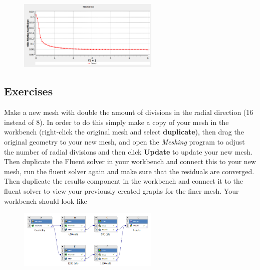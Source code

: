 \documentclass[11pt,a4paper,oneside]{scrartcl}
\newcommand\bfr[1]{\textcolor[rgb]{1,0.00,0.00}{\textbf{\textsf{#1}}}}
\begin{document}
\begin{figure}[H]
\begin{center}
\includegraphics[width=0.6\textwidth,clip]{skin_friction_coefficient.png}
\end{center}
\end{figure}


\subsection{Exercises}
Make a new mesh with double the amount of divisions in the radial direction (16 instead of 8). In order to do this simply make a copy of your mesh in the workbench (right-click the original mesh and select \bfr{duplicate}), then drag the original geometry to your new mesh, and open the \emph{Meshing} program to  adjust the number of radial divisions and then click \bfr{Update} to update your new mesh. Then duplicate the Fluent solver in your workbench and connect this to your new mesh, run the fluent solver again and make sure that the residuals are converged. Then duplicate the results component in the workbench and connect it to the fluent solver to view your previously created graphs for the finer mesh. Your workbench should look like
\begin{figure}[H]
\begin{center}
\includegraphics[width=0.6\textwidth,clip]{workbench_finemesh.png}
\end{center}
\end{figure}
\end{document}
